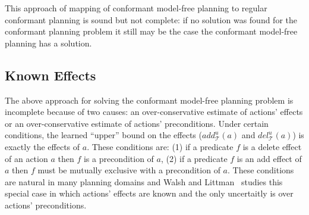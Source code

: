 This approach of mapping of conformant model-free planning to regular  conformant planning is sound but not complete: if no solution was found for the conformant planning problem it still may be the case the conformant model-free planning has a solution. 

\subsection{Known Effects}

The above approach for solving the conformant model-free planning problem is incomplete because of two causes: an over-conservative estimate of actions' effects or an over-conservative estimate of actions' preconditions. Under certain conditions, the learned ``upper'' bound on the effects ($add_\mathcal{T}^u(a)$ and $del_\mathcal{T}^u(a)$) is exactly the effects of $a$. These conditions are:
(1) if a predicate $f$ is a delete effect of an action $a$ then $f$ is a precondition of $a$, 
(2) if a predicate $f$ is an add effect of $a$ then $f$ must be mutually exclusive with a precondition of $a$. 
These conditions are natural in many planning domains and Walsh and Littman~ studies this special case in which actions' effects are known and the only uncertaitly is over actions' preconditions. 


